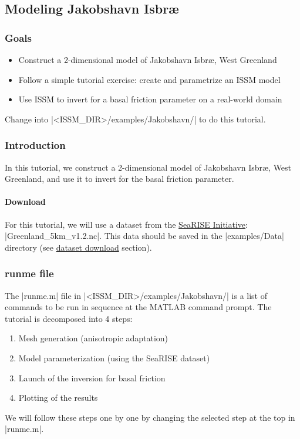 
\subsection{Modeling Jakobshavn Isbr\ae} \label{sec:using-issm-tutorials-jks}
\subsubsection{Goals} %
\begin{itemize}
	\item Construct a 2-dimensional model of Jakobshavn Isbr\ae, West Greenland
	\item Follow a simple tutorial exercise: create and parametrize an ISSM model
	\item Use ISSM to invert for a basal friction parameter on a real-world domain
\end{itemize}

Change into \lstinlinebg|<ISSM_DIR>/examples/Jakobshavn/| to do this tutorial.

\subsubsection{Introduction}
In this tutorial, we construct a 2-dimensional model of Jakobshavn Isbr\ae, West Greenland, and use it to invert for the basal friction parameter.

\paragraph{Download}
For this tutorial, we will use a dataset from the \href{https://scholarworks.umt.edu/cgi/viewcontent.cgi?params=/context/cs_pubs/article/1020/&path_info=Ice_sheet_model.pdf}{SeaRISE Initiative}: \lstinlinebg|Greenland_5km_v1.2.nc|. This data should be saved in the \lstinlinebg|examples/Data| directory (see 
\hyperref[sec:using-issm-tutorials-datasets]{dataset download} section).

\subsubsection{runme file}
The \lstinlinebg|runme.m| file in \lstinlinebg|<ISSM_DIR>/examples/Jakobshavn/| is a list of commands to be run in sequence at the MATLAB command prompt. The tutorial is decomposed into 4 steps:
\begin{enumerate}
	\item Mesh generation (anisotropic adaptation)
	\item Model parameterization (using the SeaRISE dataset)
	\item Launch of the inversion for basal friction
	\item Plotting of the results
\end{enumerate}
We will follow these steps one by one by changing the selected step at the top in \lstinlinebg|runme.m|.

